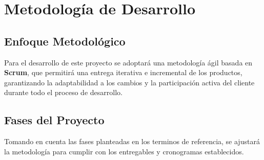 \section{Metodología de Desarrollo}

\subsection{Enfoque Metodológico}

Para el desarrollo de este proyecto se adoptará una metodología ágil basada en \textbf{Scrum}, que permitirá una entrega iterativa e incremental de los productos, garantizando la adaptabilidad a los cambios y la participación activa del cliente durante todo el proceso de desarrollo.

\subsection{Fases del Proyecto}

Tomando en cuenta las fases planteadas en los terminos de referencia, se ajustará la metodología para cumplir con los entregables y cronogramas establecidos.

